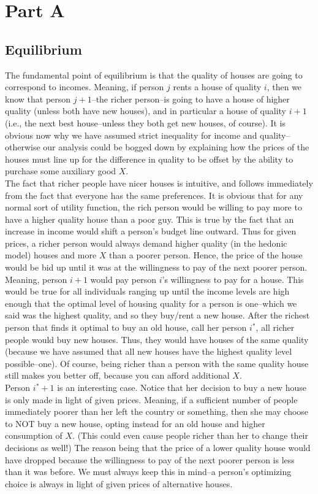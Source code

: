 \documentclass[12pt]{paper}
\begin{document}
\section*{Part A}
\subsection*{Equilibrium}


The fundamental point of equilibrium is that the quality of houses are going to correspond to incomes. Meaning, if person $j$ rents a house of quality $i$, then we know that person $j+1$--the richer person--is going to have a house of higher quality (unless both have new houses), and in particular a house of quality $i+1$ (i.e., the next best house--unless they both get new houses, of course). It is obvious now why we have assumed strict inequality for income and quality--otherwise our analysis could be bogged down by explaining how the prices of the houses must line up for the difference in quality to be offset by the ability to purchase some auxiliary good $X$.\\


The fact that richer people have nicer houses is intuitive, and follows immediately from the fact that everyone has the same preferences. It is obvious that for any normal sort of utility function, the rich person would be willing to pay more to have a higher quality house than a poor guy. This is true by the fact that an increase in income would shift a person's budget line outward. Thus for given prices, a richer person would always demand higher quality (in the hedonic model) houses and more $X$ than a poorer person. Hence, the price of the house would be bid up until it was at the willingness to pay of the next poorer person. Meaning, person $i+1$ would pay person $i$'s willingness to pay for a house. This would be true for all individuals ranging up until the income levels are high enough that the optimal level of housing quality for a person is one--which we said was the highest quality, and so they buy/rent a new house. After the richest person that finds it optimal to buy an old house, call her person $i^*$, all richer people would buy new houses. Thus, they would have houses of the same quality (because we have assumed that all new houses have the highest quality level possible--one). Of course, being richer than a person with the same quality house still makes you better off, because you can afford additional $X$.\\


Person $i^*+1$ is an interesting case. Notice that her decision to buy a new house is only made in light of given prices. Meaning, if a sufficient number of people immediately poorer than her left the country or something, then she may choose to NOT buy a new house, opting instead for an old house and higher consumption of $X$. (This could even cause people richer than her to change their decisions as well!) The reason being that the price of a lower quality house would have dropped because the willingness to pay of the next poorer person is less than it was before. We must always keep this in mind--a person's optimizing choice is always in light of given prices of alternative houses.
\end{document}
